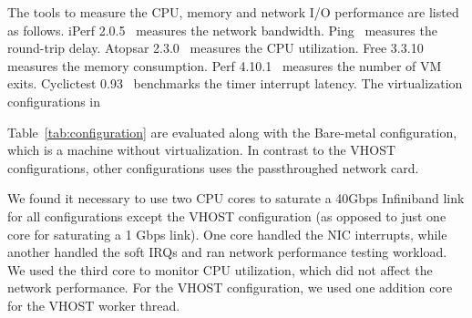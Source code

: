 The tools to measure the CPU, memory and network I/O
performance are listed as follows. iPerf 2.0.5~\cite{iperf}
measures the network bandwidth. Ping~\cite{ping} measures the
round-trip delay. Atopsar 2.3.0~\cite{atopsar} measures the
CPU utilization. Free 3.3.10~\cite{free} measures the memory
consumption. Perf 4.10.1~\cite{perf} measures the number of VM
exits. Cyclictest 0.93~\cite{cyclictest} benchmarks the timer
interrupt latency. The virtualization configurations in


Table~\ref{tab:configuration} are evaluated along with the
Bare-metal configuration, which is a machine without
virtualization. In contrast to the VHOST configurations, other
configurations uses the passthroughed network card.

We found it necessary to use two CPU cores to saturate a
40Gbps Infiniband link for all configurations except the VHOST
configuration (as opposed to just one core for saturating a 1
Gbps link). One core handled the NIC interrupts, while another
handled the soft IRQs and ran network performance testing
workload. We used the third core to monitor CPU utilization,
which did not affect the network performance. For the VHOST
configuration, we used one addition core for the VHOST worker
thread.



